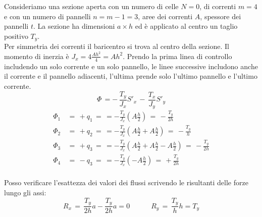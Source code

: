 \begin{esempioBox}
    Consideriamo una sezione aperta con un numero di celle $N=0$, di correnti $m=4$ e con un numero di pannelli $n=m-1=3$, aree dei correnti $A$, spessore dei pannelli $t$. La sezione ha dimensioni $a\times h$ ed è applicato al centro un taglio positivo $T_y$.\\
    Per simmetria dei correnti il baricentro si trova al centro della sezione. Il momento di inerzia è $J_x = 4\frac{Ah^2}{4}=Ah^2$. Prendo la prima linea di controllo includendo un solo corrente e un solo pannello, le linee successive includono anche il corrente e il pannello adiacenti, l'ultima prende solo l'ultimo pannello e l'ultimo corrente.
    \begin{equation*}
       \Phi\, = -\, \frac{T_y}{J_x}S'_x  \,-\, \frac{T_x}{J_y}S'_y 
    \end{equation*}
    \begin{align*}
        \Phi_1 \,&=\, +q_1 \,= \, = -\frac{T_y}{J_x}\left( A\frac{h}{2} \right) \,=\, -\frac{T_y}{2h}\\
         \Phi_2 \,&=\, +q_2 \,= \, = -\frac{T_y}{J_x}\left( A\frac{h}{2}+A\frac{h}{2} \right) \,=\, -\frac{T_y}{h}\\
          \Phi_3 \,&=\, +q_3 \,= \, = -\frac{T_y}{J_x}\left( A\frac{h}{2}+A\frac{h}{2}-A\frac{h}{2} \right) \,=\, -\frac{T_y}{2h}\\
           \Phi_4 \,&=\, -q_3 \,= \, = -\frac{T_y}{J_x}\left( -A\frac{h}{2} \right) \,=\, +\frac{T_y}{2h}\\
    \end{align*}


Posso verificare l'esattezza dei valori dei flussi scrivendo le risultanti delle forze lungo gli assi:
\begin{equation*}
    R_x\, = \, \frac{T_y}{2h}a-\frac{T_y}{2h}a=0  \quad\quad\quad R_y\, = \, \frac{T_y}{h}h = T_y
\end{equation*}


\end{esempioBox}
